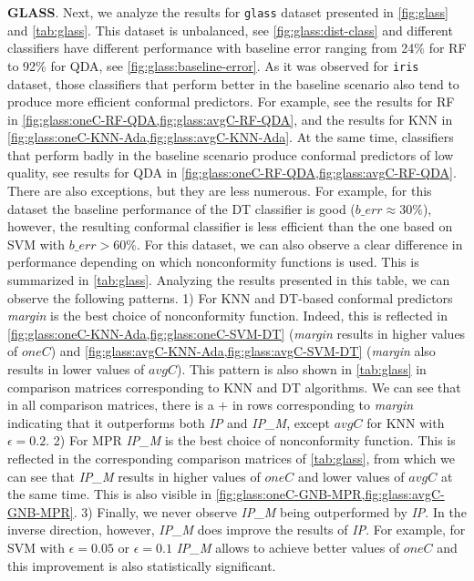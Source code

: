 \textbf{GLASS}.
Next, we analyze the results for \verb|glass| dataset presented in \cref{fig:glass} and 
\cref{tab:glass}. This dataset is unbalanced, see \cref{fig:glass:dist-class} and 
different classifiers have different performance with baseline error ranging from 24\% for RF to 92\%
for QDA, see \cref{fig:glass:baseline-error}. As it was observed for \verb|iris| dataset, those 
classifiers that perform better in the baseline scenario also tend to produce more efficient 
conformal predictors.
For example, see the results for RF in \cref{fig:glass:oneC-RF-QDA,fig:glass:avgC-RF-QDA}, and the 
results for KNN in \cref{fig:glass:oneC-KNN-Ada,fig:glass:avgC-KNN-Ada}.
At the same time, classifiers that perform badly in the baseline scenario produce conformal 
predictors of low quality, see results for QDA in \cref{fig:glass:oneC-RF-QDA,fig:glass:avgC-RF-QDA}.
There are also exceptions, but they are less numerous. 
For example, for this dataset the baseline performance of the DT classifier is good ($b\_err \approx 
30\%$), however, the resulting conformal classifier is less efficient than the one based on SVM with 
$b\_err > 60\%$.
For this dataset, we can also observe a clear difference in performance depending on which 
nonconformity functions is used.
This is summarized in \cref{tab:glass}. 
Analyzing the results presented in this table, we can observe the following patterns.
1) For KNN and DT-based conformal predictors \textit{margin} is the best choice of nonconformity function.
Indeed, this is reflected in \cref{fig:glass:oneC-KNN-Ada,fig:glass:oneC-SVM-DT} (\textit{margin} 
results in higher values of $oneC$) and  \cref{fig:glass:avgC-KNN-Ada,fig:glass:avgC-SVM-DT} 
(\textit{margin} also results in lower values of $avgC$).
This pattern is also shown in \cref{tab:glass} in comparison matrices corresponding to KNN and DT algorithms. 
We can see that in all comparison matrices, there is a $+$ in rows corresponding to \textit{margin}
indicating that it outperforms both \textit{IP} and \textit{IP\_M},
except $avgC$ for KNN with $\epsilon=0.2$.
2) For MPR \textit{IP\_M} is the best choice of nonconformity function. 
This is reflected in the corresponding comparison matrices of \cref{tab:glass}, from which we can see
that \textit{IP\_M} results in higher values of $oneC$ and lower values of $avgC$ at the same time.
This is also visible in \cref{fig:glass:oneC-GNB-MPR,fig:glass:avgC-GNB-MPR}.
3) Finally, we never observe \textit{IP\_M} being outperformed by \textit{IP}. In the inverse direction,
however, \textit{IP\_M} does improve the results of \textit{IP}.
For example, for SVM with $\epsilon=0.05$ or $\epsilon=0.1$ \textit{IP\_M} allows to achieve better 
values of $oneC$ and this improvement is also statistically significant.



